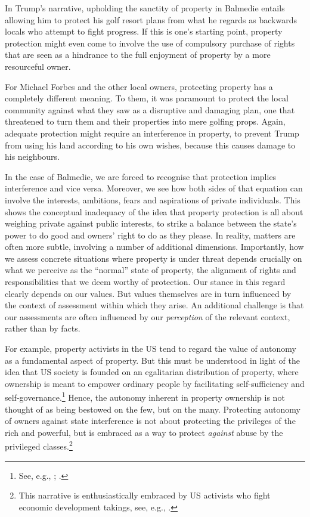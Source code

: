 In Trump's narrative, upholding the sanctity of property in Balmedie entails allowing him to protect his golf resort plans from what he regards as backwards locals who attempt to fight progress. If this is one's starting point, property protection might even come to involve the use of compulsory purchase of rights that are seen as a hindrance to the full enjoyment of property by a more resourceful owner. 

For Michael Forbes and the other local owners, protecting property has a completely different meaning. To them, it was paramount to protect the local community against what they saw as a disruptive and damaging plan, one that threatened to turn them and their properties into mere golfing props. Again, adequate protection might require an interference in property, to prevent Trump from using his land according to his own wishes, because this causes damage to his neighbours. 

In the case of Balmedie, we are forced to recognise that protection implies interference and vice versa. Moreover, we see how both sides of that equation can involve the interests, ambitions, fears and aspirations of private individuals. This shows the conceptual inadequacy of the idea that property protection is all about weighing private against public interests, to strike a balance between the state's power to do good and owners' right to do as they please. In reality, matters are often more subtle, involving a number of additional dimensions. Importantly, how we assess concrete situations where property is under threat depends crucially on what we perceive as the ``normal'' state of property, the alignment of rights and responsibilities that we deem  worthy of protection. Our stance in this regard clearly depends on our values. But values themselves are in turn influenced by the context of assessment within which they arise. An additional challenge is that our assessments are often influenced by our \emph{perception} of the relevant context, rather than by facts.

For example, property activists in the US tend to regard the value of autonomy as a fundamental aspect of property. But this must be understood in light of the idea that US society is founded on an egalitarian distribution of property, where ownership is meant to empower ordinary people by facilitating self-sufficiency and self-governance.\footnote{See, e.g., \cite[173]{ely07}; \cite{rose96}.} Hence, the autonomy inherent in property ownership is not thought of as being bestowed on the few, but on the many. Protecting autonomy of owners against state interference is not about protecting the privileges of the rich and powerful, but is embraced as a way to protect {\it against} abuse by the privileged classes.\footnote{This narrative is enthusiastically embraced by US activists who fight economic development takings, see, e.g., \cite{castle15}.} 

